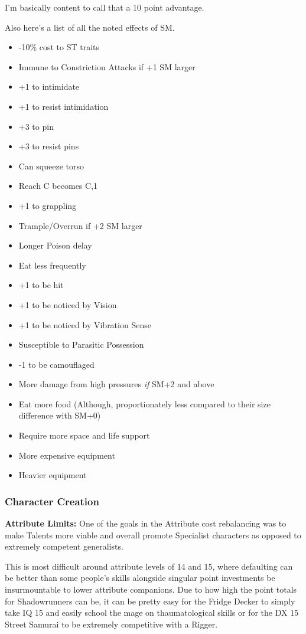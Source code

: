 \begin{multicols*}{2}
	I'm basically content to call that a 10 point advantage.
	
	
	Also here's a list of all the noted effects of SM.
	
	\begin{itemize}
		\itemsep 0pt
		\item -10\% cost to ST traits
		\item Immune to Constriction Attacks if +1 SM larger
		\item +1 to intimidate
		\item +1 to resist intimidation
		\item +3 to pin
		\item +3 to resist pins
		\item Can squeeze torso
		\item Reach C becomes C,1
		\item +1 to grappling
		\item Trample/Overrun if +2 SM larger
		\item Longer Poison delay
		\item Eat less frequently
		\item +1 to be hit
		\item +1 to be noticed by Vision
		\item +1 to be noticed by Vibration Sense
		\item Susceptible to Parasitic Possession
		\item -1 to be camouflaged
		\item More damage from high pressures \textit{if} SM+2 and above
		\item Eat more food (Although, proportionately less compared to their size difference with SM+0)
		\item Require more space and life support
		\item More expensive equipment
		\item Heavier equipment
	\end{itemize}
	
		
	\subsubsection{Character Creation}
	
	\textbf{Attribute Limits: } One of the goals in the Attribute cost rebalancing was to make Talents more viable and overall promote Specialist characters as opposed to extremely competent generalists. 
	
	This is most difficult around attribute levels of 14 and 15, where defaulting can be better than some people's skills alongside singular point investments be insurmountable to lower attribute companions. Due to how high the point totals for Shadowrunners can be, it can be pretty easy for the Fridge Decker to simply take IQ 15 and easily school the mage on thaumatological skills or for the DX 15 Street Samurai to be extremely competitive with a Rigger.
	

\end{multicols*}
